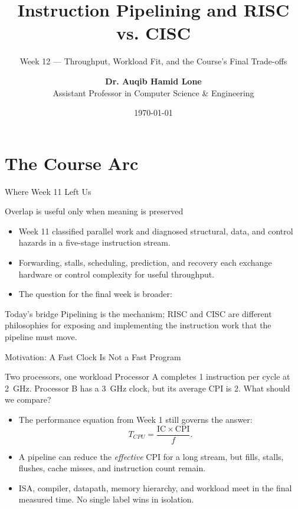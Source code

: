 \documentclass[aspectratio=169]{beamer}
\title{Instruction Pipelining and RISC vs. CISC}
\subtitle{Week 12 --- Throughput, Workload Fit, and the Course's Final Trade-offs}
\author[Dr. Auqib Hamid Lone]{%
  \textbf{Dr. Auqib Hamid Lone}\\
  \small Assistant Professor in Computer Science \& Engineering
}
\institute[GCET Ganderbal]{%
  \small\textbf{PCC CS-401: Computer Organization and Architecture}\\[0.3em]
  Department of Computer Science \& Engineering\\
  Government College of Engineering \& Technology (GCET), Ganderbal
}
\date[\today]{\small\today}
\begin{document}
\frame{\titlepage}

\section{The Course Arc}

\begin{frame}{Where Week 11 Left Us}
  \begin{block}{Overlap is useful only when meaning is preserved}
    \begin{itemize}
      \item Week 11 classified parallel work and diagnosed structural, data,
        and control hazards in a five-stage instruction stream.
      \item Forwarding, stalls, scheduling, prediction, and recovery each
        exchange hardware or control complexity for useful throughput.
      \item The question for the final week is broader: 
    \end{itemize}
  \end{block}
  \begin{exampleblock}{Today's bridge}
    Pipelining is the mechanism; RISC and CISC are different philosophies for
    exposing and implementing the instruction work that the pipeline must move.
  \end{exampleblock}
\end{frame}

\begin{frame}{Motivation: A Fast Clock Is Not a Fast Program}
  \begin{exampleblock}{Two processors, one workload}
    Processor A completes 1 instruction per cycle at 2~GHz. Processor B has a
    3~GHz clock, but its average CPI is 2. What should we compare?
  \end{exampleblock}
  \begin{itemize}
    \item The performance equation from Week 1 still governs the answer:
      \[
        T_{CPU}=\frac{\mathrm{IC}\times\mathrm{CPI}}{f}.
      \]
    \item A pipeline can reduce the \emph{effective} CPI for a long stream,
      but fills, stalls, flushes, cache misses, and instruction count remain.
    \item ISA, compiler, datapath, memory hierarchy, and workload meet in the
      final measured time. No single label wins in isolation.
  \end{itemize}
\end{frame}
\end{document}
